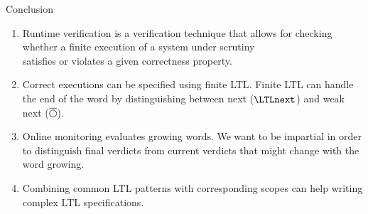 \begin{frame}{Conclusion}
  \begin{enumerate}
    \item \alert{Runtime verification} is a \alert{verification technique} that allows for checking\\
    whether a finite \alert{execution} of a system under scrutiny\\
    \alert{satisfies or violates} a given correctness property.
    \item \alert{Correct executions} can be \alert{specified using finite LTL}. Finite LTL can \alert{handle the end of the word} by distinguishing between next ($\LTLnext$) and \alert{weak next ($\LTLweaknext$)}.
    \item \alert{Online monitoring} evaluates \alert{growing words}. We want to be \alert{impartial} in order to distinguish \alert{final verdicts} from \alert{current verdicts} that might change with the word growing.
    \item Combining common \alert{LTL patterns} with corresponding \alert{scopes} can help writing complex LTL specifications.
  \end{enumerate}
\end{frame}
